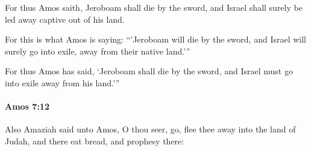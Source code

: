 			\begin{versebox}
					\item[BHS] 
					\item[LXX] 
					\item[ASV] For thus Amos saith, Jeroboam shall die by the sword, and Israel shall surely be led away captive out of his land.
					\item[NIV] For this is what Amos is saying: “’Jeroboam will die by the sword, and Israel will surely go into exile, away from their native land.’”
					\item[NRSV] For thus Amos has said, ‘Jeroboam shall die by the sword, and Israel must go into exile away from his land.’”
			\end{versebox}

		\paragraph{Amos 7:12} %
			\label{AMOS-7-12}

			Also Amaziah said unto Amos, O thou seer, go, flee thee away into the land of Judah, and there eat bread, and prophesy there:

